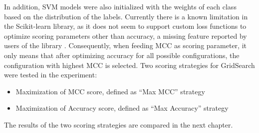 In addition, \ac{SVM} models were also initialized with the weights of each class based on the distribution of the labels. Currently there is a known limitation in the Scikit-learn library, as it does not seem to support custom loss functions to optimize scoring parameters other than accuracy, a missing feature reported by users of the library \cite{martin_stacked_nodate, noauthor_please_nodate}. Consequently, when feeding \ac{MCC} as scoring parameter, it only means that after optimizing accuracy for all possible configurations, the configuration with highest \ac{MCC} is selected. Two scoring strategies for GridSearch were tested in the experiment:
\begin{itemize}
\item 	Maximization of \ac{MCC} score, defined as “Max MCC” strategy
\item 	Maximization of Accuracy score, defined as “Max Accuracy” strategy
\end{itemize}
The results of the two scoring strategies are compared in the next chapter.

